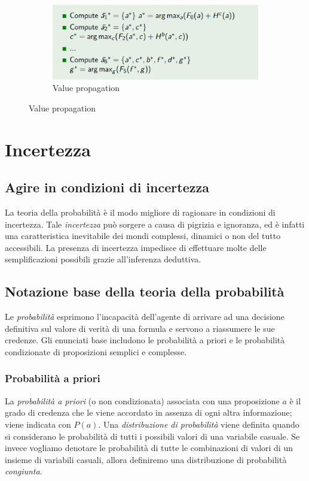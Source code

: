 \documentclass[11pt,oneside]{book}
\begin{document}
\begin{figure}[htp]
\begin{subfigure}{0.49\textwidth}
	    \centering
		\includegraphics[width=\textwidth, height=\textheight, keepaspectratio]{dp-example4.png}
		\caption{Value propagation}
	\end{subfigure}
\end{figure}


\chapter{Incertezza}

\section{Agire in condizioni di incertezza}
La teoria della probabilità è il modo migliore di ragionare in condizioni di incertezza. Tale \textit{incertezza} può sorgere a causa di pigrizia e ignoranza, ed è infatti una caratteristica inevitabile dei mondi complessi, dinamici o non del tutto accessibili. La presenza di incertezza impedisce di effettuare molte delle semplificazioni possibili grazie all'inferenza deduttiva.

\section{Notazione base della teoria della probabilità}
Le \textit{probabilità} esprimono l'incapacità dell'agente di arrivare ad una decisione definitiva sul valore di verità di una formula e servono a riassumere le sue credenze. Gli enunciati base includono le probabilità a priori e le probabilità condizionate di proposizioni semplici e complesse.

\subsection{Probabilità a priori}
La \textit{probabilità a priori} (o non condizionata) associata con una proposizione $a$ è il grado di credenza che le viene accordato in assenza di ogni altra informazione; viene indicata con $P(a)$. Una \textit{distribuzione di probabilità} viene definita quando si considerano le probabilità di tutti i possibili valori di una variabile casuale. Se invece vogliamo denotare le probabilità di tutte le combinazioni di valori di un insieme di variabili casuali, allora definiremo una distribuzione di probabilità \textit{congiunta}.
\end{document}
